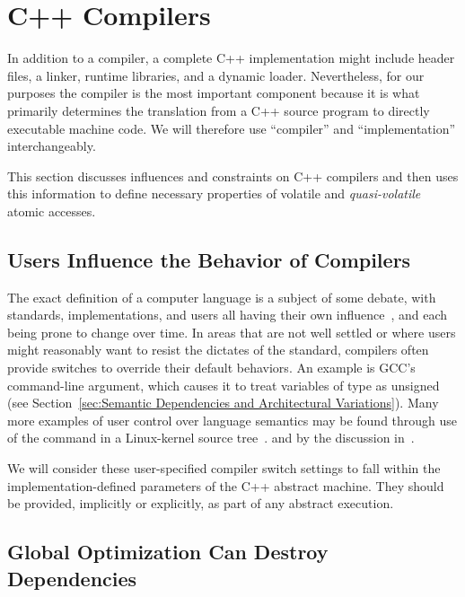 \section{C++ Compilers}
\label{sec:C++ Compilers}

In addition to a compiler, a complete C++ implementation might include
 header files, a linker, runtime libraries, and a dynamic loader.
Nevertheless, for our purposes the compiler is the most important
component because it is what primarily determines the translation from
a C++ source program to directly executable machine code.
We will therefore use ``compiler'' and ``implementation'' interchangeably.

This section discusses influences and constraints on C++ compilers
and then uses this information to define necessary properties of
volatile and \emph{quasi-volatile} atomic accesses.

\subsection{Users Influence the Behavior of Compilers}
\label{sec:Users Influence the Behavior of Compilers}

The exact definition of a computer language is a subject of some debate,
with standards, implementations, and users all having their own
influence~\cite{KayvanMemarian2016DepthOfC-1,KayvanMemarian2016DepthOfC-2},
and each being prone to change over time.
In areas that are not well settled or where users might reasonably
want to resist the dictates of the standard,
compilers often provide switches to override their default behaviors.
An example is GCC's  command-line argument,
which causes it to treat variables of type  as unsigned
(see Section~\ref{sec:Semantic Dependencies and Architectural Variations}).
Many more examples of user control over language semantics
may be found through use of the command 
in a Linux-kernel source
tree~\cite[Appendix B]{PaulEMcKenney2023P3046R2/OOTAwithoutTrying}.
and by the discussion
in~\cite{KayvanMemarian2016DepthOfC-1,KayvanMemarian2016DepthOfC-2}.

We will consider these user-specified compiler switch settings to fall
within the implementation-defined parameters of the C++ abstract machine.
They should be provided, implicitly or explicitly, as part of any
abstract execution.

\subsection{Global Optimization Can Destroy Dependencies}
\label{sec:Global Optimization Can Destroy Dependencies}

